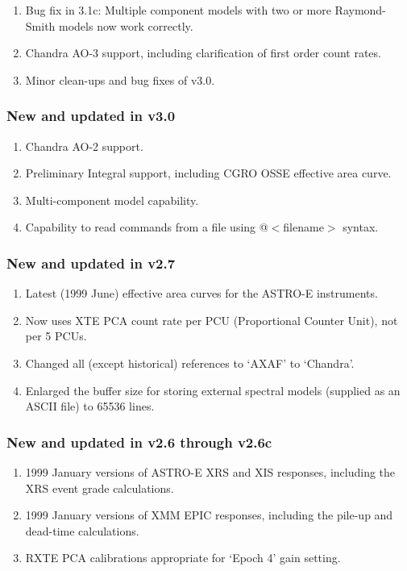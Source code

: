 \begin{enumerate}
\item Bug fix in 3.1c: Multiple component models with two or more
	Raymond-Smith models now work correctly.
\item Chandra AO-3 support, including clarification of first order count rates.
\item Minor clean-ups and bug fixes of v3.0.
\end{enumerate}

\subsubsection{New and updated in v3.0}

\begin{enumerate}
\item Chandra AO-2 support.
\item Preliminary Integral support, including CGRO OSSE effective area curve.
\item Multi-component model capability.
\item Capability to read commands from a file using @$<$filename$>$ syntax.
\end{enumerate}

\subsubsection{New and updated in v2.7}

\begin{enumerate}
\item Latest (1999 June) effective area curves for the ASTRO-E instruments.
\item Now uses XTE PCA count rate per PCU (Proportional Counter Unit), not
	per 5 PCUs.
\item Changed all (except historical) references to `AXAF' to `Chandra'.
\item Enlarged the buffer size for storing external spectral models
	(supplied as an ASCII file) to 65536 lines.
\end{enumerate}

\subsubsection{New and updated in v2.6 through v2.6c}

\begin{enumerate}
\item 1999 January versions of ASTRO-E XRS and XIS responses, including the
  XRS event grade calculations.
\item 1999 January versions of XMM EPIC responses, including the pile-up and
  dead-time calculations.
\item RXTE PCA calibrations appropriate for `Epoch 4' gain setting.
\end{enumerate}

